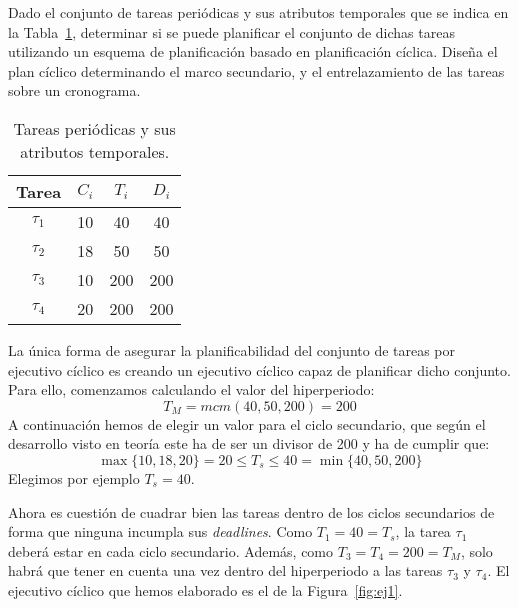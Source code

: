 \begin{ejercicio}\label{ej:rel4_1}
    Dado el conjunto de tareas periódicas y sus atributos temporales que se indica en la Tabla~\ref{tab:4_1}, determinar si se puede planificar el conjunto de dichas tareas utilizando un esquema de planificación basado en planificación cíclica. Diseña el plan cíclico determinando el marco secundario, y el entrelazamiento de las tareas sobre un cronograma.
    \begin{table}[H]
    \centering
    \begin{tabular}{|c|c|c|c|}
        \hline
        Tarea & $C_i$ & $T_i$ & $D_i$ \\
        \hline
        $\tau_1$ & 10 & 40 & 40 \\
        \hline
        $\tau_2$ & 18 & 50 & 50 \\
        \hline
        $\tau_3$ & 10 & 200 & 200 \\
        \hline
        $\tau_4$ & 20 & 200 & 200 \\
        \hline
    \end{tabular}
    \caption{Tareas periódicas y sus atributos temporales.}
    \label{tab:4_1}
    \end{table}

    La única forma de asegurar la planificabilidad del conjunto de tareas por ejecutivo cíclico es creando un ejecutivo cíclico capaz de planificar dicho conjunto. Para ello, comenzamos calculando el valor del hiperperiodo:
    \begin{equation*}
        T_M = mcm(40,50,200) = 200
    \end{equation*}
    A continuación hemos de elegir un valor para el ciclo secundario, que según el desarrollo visto en teoría este ha de ser un divisor de 200 y ha de cumplir que:
    \begin{equation*}
        \max\{10,18,20\} = 20 \leq T_s \leq 40 = \min\{40,50,200\}
    \end{equation*}
    Elegimos por ejemplo $T_s = 40$.

    Ahora es cuestión de cuadrar bien las tareas dentro de los ciclos secundarios de forma que ninguna incumpla sus \textit{deadlines}. Como $T_1=40=T_s$, la tarea $\tau_1$ deberá estar en cada ciclo secundario. Además, como $T_3=T_4=200=T_M$, solo habrá que tener en cuenta una vez dentro del hiperperiodo a las tareas $\tau_3$ y $\tau_4$. El ejecutivo cíclico que hemos elaborado es el de la Figura~\ref{fig:ej1}.


\end{ejercicio}

